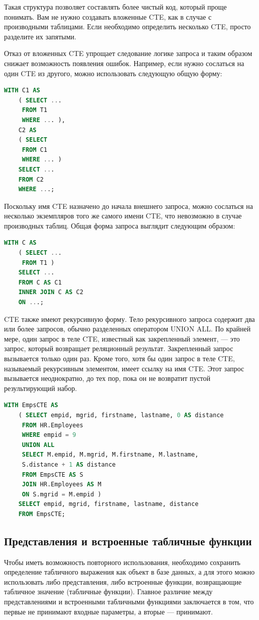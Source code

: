 Такая структура позволяет составлять более чистый код, который проще понимать.
Вам не нужно создавать вложенные CTE, как в случае с производными таблицами.
Если необходимо определить несколько CTE, просто разделите их запятыми.

Отказ от вложенных CTE упрощает следование логике запроса и таким образом снижает возможность появления ошибок. Например,
если нужно сослаться на один CTE из другого, можно использовать следующую
общую форму: 

\begin{lstlisting}[label=lst:funcReturn, language=sql]
	WITH C1 AS
	( SELECT ...
	 FROM T1
	 WHERE ... ),
	C2 AS
	( SELECT
	 FROM C1
	 WHERE ... )
	SELECT ...
	FROM C2
	WHERE ...; 
\end{lstlisting}

Поскольку имя CTE назначено до начала внешнего запроса, можно сослаться на
несколько экземпляров того же самого имени CTE, что невозможно в случае производных таблиц. Общая форма запроса выглядит следующим образом: 

\begin{lstlisting}[label=lst:funcReturn, language=sql]
	WITH C AS
	( SELECT ...
	 FROM T1 )
	SELECT ...
	FROM C AS C1
	INNER JOIN C AS C2
	ON ...; 
\end{lstlisting}

CTE также имеют рекурсивную форму. Тело рекурсивного запроса содержит два
или более запросов, обычно разделенных оператором UNION ALL. По крайней мере,
один запрос в теле CTE, известный как закрепленный элемент, — это запрос, который возвращает реляционный результат. Закрепленный запрос вызывается только
один раз. Кроме того, хотя бы один запрос в теле CTE, называемый рекурсивным
элементом, имеет ссылку на имя CTE. Этот запрос вызывается неоднократно, до
тех пор, пока он не возвратит пустой результирующий набор.

\begin{lstlisting}[label=lst:funcReturn, language=sql]
	WITH EmpsCTE AS
	( SELECT empid, mgrid, firstname, lastname, 0 AS distance
	 FROM HR.Employees
	 WHERE empid = 9 
	 UNION ALL
	 SELECT M.empid, M.mgrid, M.firstname, M.lastname,
	 S.distance + 1 AS distance
	 FROM EmpsCTE AS S
	 JOIN HR.Employees AS M
	 ON S.mgrid = M.empid )
	SELECT empid, mgrid, firstname, lastname, distance
	FROM EmpsCTE;
\end{lstlisting}

\subsection{Представления и встроенные табличные функции}
Чтобы иметь возможность повторного использования, необходимо сохранить определение табличного выражения как объект в базе данных, а для этого можно использовать либо представления, либо встроенные функции, возвращающие табличное значение (табличные функции).
Главное различие между представлениями и встроенными табличными функциями
заключается в том, что первые не принимают входные параметры, а вторые — принимают.

